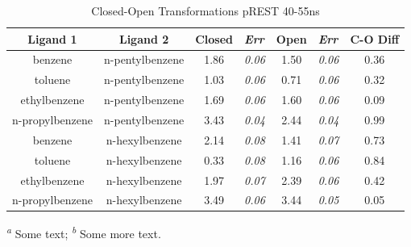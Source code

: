 \documentclass[journal=jctcce,manuscript=article]{achemso}
\begin{document}
\begin{table}[!htb]
\centering
\caption{Closed-Open Transformations pREST 40-55ns}
\label{tbl:C-O_pREST-40-55ns}
\begin{tabular}{|c|c|c|l|c|l|c|}
\hline
\textbf{Ligand 1}                       & \textbf{Ligand 2}                       & {\color[HTML]{800080} \textbf{Closed}} & {\color[HTML]{800080} \textit{Err}} & {\color[HTML]{008000} \textbf{Open}} & {\color[HTML]{008000} \textit{Err}} & \textbf{C-O Diff}            \\ \hline
\cellcolor[HTML]{800080}benzene         & \cellcolor[HTML]{008000}n-pentylbenzene & 1.86                                   & \textit{0.06}                       & 1.50                                & \textit{0.06}                       & \cellcolor[HTML]{FFCCC9}0.36 \\ \hline
\cellcolor[HTML]{800080}toluene         & \cellcolor[HTML]{008000}n-pentylbenzene & 1.03                                   & \textit{0.06}                       & 0.71                                 & \textit{0.06}                       & \cellcolor[HTML]{FFCCC9}0.32 \\ \hline
\cellcolor[HTML]{800080}ethylbenzene    & \cellcolor[HTML]{008000}n-pentylbenzene & 1.69                                   & \textit{0.06}                       & 1.60                                 & \textit{0.06}                       & \cellcolor[HTML]{FFCCC9}0.09 \\ \hline
\cellcolor[HTML]{800080}n-propylbenzene & \cellcolor[HTML]{008000}n-pentylbenzene & 3.43                                   & \textit{0.04}                       & 2.44                                & \textit{0.04}                       & \cellcolor[HTML]{FFCCC9}0.99 \\ \hline
\cellcolor[HTML]{800080}benzene         & \cellcolor[HTML]{008000}n-hexylbenzene  & 2.14                                   & \textit{0.08}                       & 1.41                                & \textit{0.07}                       & \cellcolor[HTML]{FFCCC9}0.73 \\ \hline
\cellcolor[HTML]{800080}toluene         & \cellcolor[HTML]{008000}n-hexylbenzene  & 0.33                                   & \textit{0.08}                       & 1.16                                & \textit{0.06}                       & \cellcolor[HTML]{FFCCC9}0.84 \\ \hline
\cellcolor[HTML]{800080}ethylbenzene    & \cellcolor[HTML]{008000}n-hexylbenzene  & 1.97                                   & \textit{0.07}                       & 2.39                                & \textit{0.06}                       & \cellcolor[HTML]{FFCCC9}0.42 \\ \hline
\cellcolor[HTML]{800080}n-propylbenzene & \cellcolor[HTML]{008000}n-hexylbenzene  & 3.49                                   & \textit{0.06}                       & 3.44                                 & \textit{0.05}                       & \cellcolor[HTML]{FFCCC9}0.05 \\ \hline
\end{tabular}

  \textsuperscript{\emph{a}} Some text;
  \textsuperscript{\emph{b}} Some more text.
\end{table}
\end{document}
